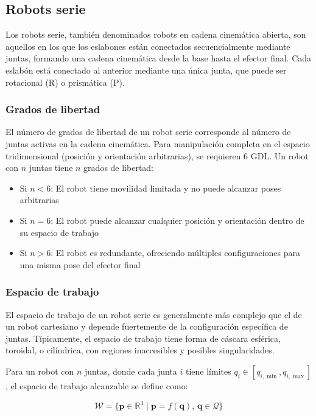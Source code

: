 \subsection{Robots serie}

Los robots serie, también denominados robots en cadena cinemática abierta, son aquellos en los que los eslabones están conectados secuencialmente mediante juntas, formando una cadena cinemática desde la base hasta el efector final. Cada eslabón está conectado al anterior mediante una única junta, que puede ser rotacional (R) o prismática (P).

\subsubsection{Grados de libertad}

El número de grados de libertad de un robot serie corresponde al número de juntas activas en la cadena cinemática. Para manipulación completa en el espacio tridimensional (posición y orientación arbitrarias), se requieren 6 GDL. Un robot con $n$ juntas tiene $n$ grados de libertad:

\begin{itemize}[label=$\bullet$]
    \item Si $n < 6$: El robot tiene movilidad limitada y no puede alcanzar poses arbitrarias
    \item Si $n = 6$: El robot puede alcanzar cualquier posición y orientación dentro de su espacio de trabajo
    \item Si $n > 6$: El robot es redundante, ofreciendo múltiples configuraciones para una misma pose del efector final
\end{itemize}

\subsubsection{Espacio de trabajo}

El espacio de trabajo de un robot serie es generalmente más complejo que el de un robot cartesiano y depende fuertemente de la configuración específica de juntas. Típicamente, el espacio de trabajo tiene forma de cáscara esférica, toroidal, o cilíndrica, con regiones inaccesibles y posibles singularidades.

Para un robot con $n$ juntas, donde cada junta $i$ tiene límites $q_i \in [q_{i,\min}, q_{i,\max}]$, el espacio de trabajo alcanzable se define como:

\begin{equation}
\mathcal{W} = \{\mathbf{p} \in \mathbb{R}^3 \mid \mathbf{p} = f(\mathbf{q}), \, \mathbf{q} \in \mathcal{Q}\}
\end{equation}

